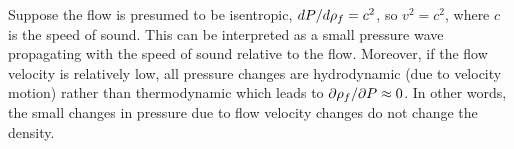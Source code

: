 \documentclass[../Article_Sensitivity_Analsysis.tex]{subfiles}
\begin{document}
	Suppose the flow is presumed to be isentropic, $d{\color{black}P}/d{\color{black}\rho_f} = c^2$, so $v^2=c^2$, where $c$ is the speed of sound. This can be interpreted as a small pressure wave propagating with the speed of sound relative to the flow. Moreover, if the flow velocity is relatively low, all pressure changes are hydrodynamic (due to velocity motion) rather than thermodynamic which leads to $\partial {\color{black}\rho_f} / \partial {\color{black}P} \approx 0$. In other words, the small changes in pressure due to flow velocity changes do not change the density. %
\end{document}
